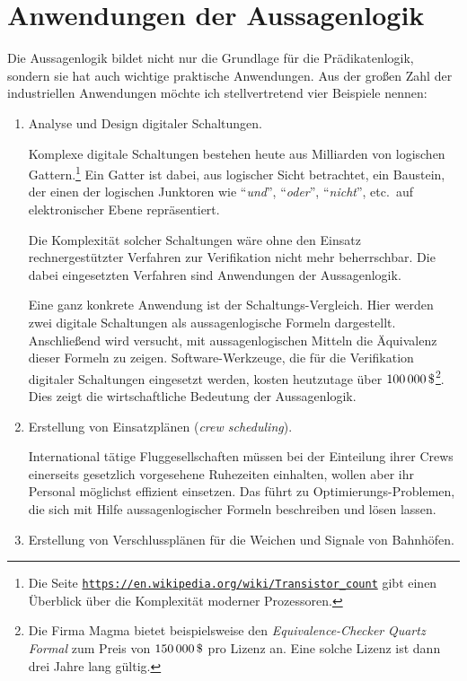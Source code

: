 \section{Anwendungen der Aussagenlogik}
Die Aussagenlogik bildet nicht nur die Grundlage f\"{u}r die Pr\"{a}dikatenlogik, sondern sie hat auch wichtige praktische
Anwendungen.  Aus der gro\ss{}en Zahl der industriellen Anwendungen m\"{o}chte ich stellvertretend vier Beispiele nennen:
\begin{enumerate}
\item Analyse und Design digitaler Schaltungen.

      Komplexe digitale Schaltungen bestehen heute aus Milliarden von logischen Gattern.\footnote{Die Seite 
      \href{https://en.wikipedia.org/wiki/Transistor_count}{\texttt{https://en.wikipedia.org/wiki/Transistor\_count}}
      gibt einen \"{U}berblick \"{u}ber die Komplexit\"{a}t moderner Prozessoren.}
      Ein Gatter ist dabei, aus logischer Sicht betrachtet, ein Baustein, der einen
      der logischen Junktoren wie ``\textsl{und}'', ``\textsl{oder}'', ``\textsl{nicht}'',
      etc.~auf elektronischer Ebene repr\"{a}sentiert. 
  
      Die Komplexit\"{a}t solcher Schaltungen w\"{a}re ohne den Einsatz
      rechnergest\"{u}tzter Verfahren zur Verifikation nicht mehr beherrschbar.  Die
      dabei eingesetzten Verfahren sind Anwendungen der Aussagenlogik. 

      Eine ganz konkrete Anwendung ist der Schaltungs-Vergleich.  Hier werden zwei
      digitale Schaltungen als aussagenlogische Formeln dargestellt.
      Anschlie\ss{}end wird versucht, mit aussagenlogischen Mitteln die \"{A}quivalenz dieser
      Formeln zu zeigen. Software-Werkzeuge, die f\"{u}r die Verifikation digitaler
      Schaltungen eingesetzt werden, kosten heutzutage \"{u}ber $100\,000\,\symbol{36}$\footnote{
        Die Firma Magma bietet beispielsweise den \emph{\color{blue}Equivalence-Checker}
        \textsl{Quartz Formal} zum Preis von $150\,000\, \symbol{36}$ pro Lizenz an.
      Eine solche Lizenz ist dann drei Jahre lang g\"{u}ltig.}.
      Dies zeigt die wirtschaftliche Bedeutung der Aussagenlogik.

\item Erstellung von Einsatzpl\"{a}nen (\emph{\color{blue}crew scheduling}).

      International t\"{a}tige Fluggesellschaften m\"{u}ssen bei der Einteilung ihrer Crews
      einerseits gesetzlich vorgesehene Ruhezeiten einhalten, wollen aber ihr Personal
      m\"{o}glichst effizient einsetzen.  Das f\"{u}hrt zu Optimierungs-Problemen, die sich mit Hilfe
      aussagenlogischer Formeln beschreiben und l\"{o}sen lassen.
\item Erstellung von Verschlusspl\"{a}nen f\"{u}r die Weichen und Signale von Bahnh\"{o}fen.


\end{enumerate}
